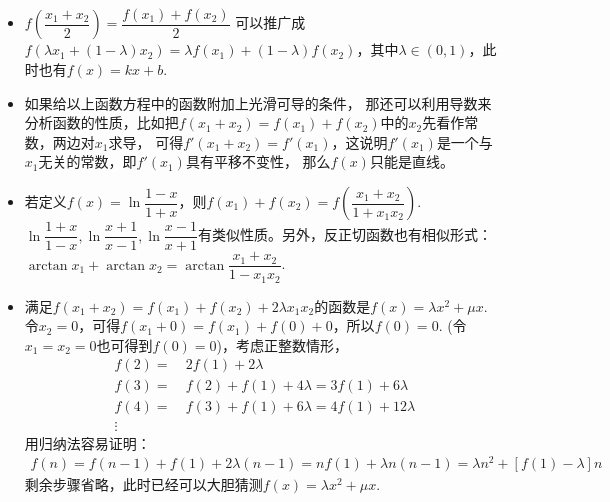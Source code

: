 \begin{itemize}[leftmargin=\inteval{\myitemleftmargin}pt,itemsep=
   \inteval{\myitemitempsep}pt,topsep=\inteval{\myitemtopsep}pt]
\item $ f\left(\dfrac{x_1+x_2}{2}\right) =\dfrac{f(x_1)+f(x_2)}{2} $
可以推广成$ f\left(\lambda x_1+(1-\lambda)x_2\right) =\lambda f(x_1)+
(1-\lambda)f(x_2) $，其中$ \lambda \in (0,1) $，此时也有$ f(x)=kx+b $. 

\item 如果给以上函数方程中的函数附加上光滑可导的条件，
那还可以利用导数来分析函数的性质，比如把$ f(x_1+x_2)=
f(x_1)+f(x_2) $中的$ x_2 $先看作常数，两边对$ x_1 $求导，
可得$ f'(x_1+x_2)=f'(x_1) $，这说明$ f'(x_1) $是一个与
$ x_1 $无关的常数，即$ f'(x_1) $具有平移不变性，
那么$ f(x) $只能是直线。

\item 若定义$ f(x)=\ln \dfrac{1-x}{1+x} $，则$ f(x_1)+f(x_2)=f\left(\dfrac{x_1+x_2}{1+x_1x_2} \right)  $. 
$ \ln \dfrac{1+x}{1-x},\ln \dfrac{x+1}{x-1},\ln \dfrac{x-1}{x+1}$有类似性质。另外，反正切函数也有相似形式：$ \arctan x_1+\arctan x_2=\arctan\dfrac{x_1+x_2}{1-x_1x_2} $. 

\item 满足$ f(x_1+x_2)= f(x_1)+f(x_2)+2\lambda x_1x_2 $的函数是$ f(x)=\lambda x^2+\mu x $. \\
令$ x_2=0 $，可得$ f(x_1+0)=f(x_1)+f(0)+0 $，所以$ f(0)=0 $.
(令$ x_1=x_2=0 $也可得到$ f(0)=0 $)，考虑正整数情形，
\begin{align*}
    f(2)=&\ 2f(1)+2\lambda \\
    f(3)=&\ f(2)+f(1)+4\lambda=3f(1)+6 \lambda \\
    f(4)=&\ f(3)+f(1)+6\lambda=4f(1)+12\lambda \\
    \vdots&\  
\end{align*}
用归纳法容易证明：
\begin{gather*}
    f(n)=f(n-1)+f(1)+2\lambda (n-1)=nf(1)+\lambda n(n-1)=
    \lambda n^2+[f(1)-\lambda]n
\end{gather*}
剩余步骤省略，此时已经可以大胆猜测$ f(x)=\lambda x^2+\mu x $. 


\end{itemize}

